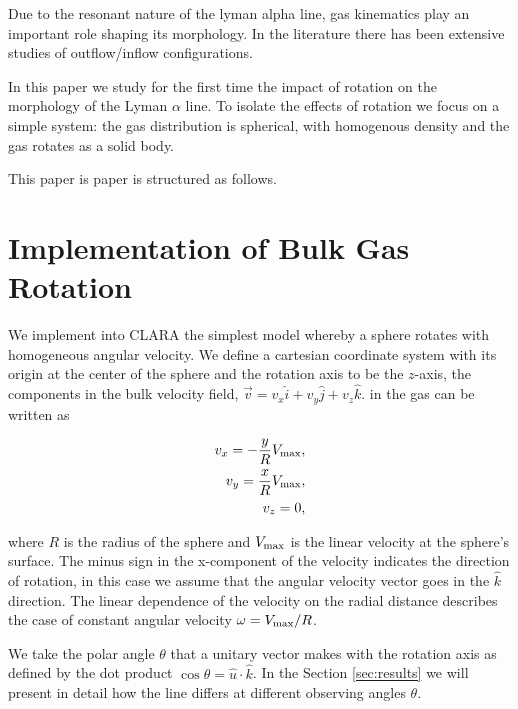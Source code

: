 \documentclass[usenatbib]{mn2e}
\begin{document}
Due to the resonant nature of the lyman alpha line, gas kinematics
play an important role shaping its morphology. In the literature there
has been extensive studies of outflow/inflow configurations. 

In this paper we study for the first time the impact of rotation on
the morphology of the Lyman $\alpha$ line. To isolate the effects of
rotation we focus on a simple system: the gas distribution is
spherical, with homogenous density and the gas rotates as a solid
body.

This paper is paper is structured as follows.



\section{Implementation of Bulk Gas Rotation}
\label{sec:implementation}

We implement into CLARA the simplest model whereby a sphere rotates
with homogeneous angular velocity. We define a cartesian coordinate
system with its origin at the center of the sphere and the rotation
axis to be the $z$-axis, the components in the bulk velocity field, $\vec{v}
= v_{x}\hat{i} + v_{y}\hat{j} + v_{z}\hat{k}$. in the gas can be written as 
 
\begin{subequations}
\begin{align}
    v_{x}=-\dfrac{y}{R}V_{\rm max}, \label{subeq1}\\
    v_{y}=\dfrac{x}{R}V_{\rm max}, \label{subeq2}\\
    v_{z}=0, \label{subeq3}
\end{align}
\end{subequations}

where $R$ is the radius of the sphere and $V_{\rm max}$ is the linear
velocity at the sphere's surface. The minus sign in the x-component of
the velocity indicates the direction of rotation, in this case we
assume that the angular velocity vector goes in the $\hat{k}$
direction.  The linear dependence of the velocity on the radial
distance describes the case of constant angular velocity
$\omega=V_{\rm max}/R$.  

We take the polar angle $\theta$ that a unitary vector makes with the
rotation axis as defined by the dot product $\cos\theta =
{\hat{u}\cdot\hat{k}}$. In the Section \ref{sec:results} we will
present in detail how the line differs at different observing angles
$\theta$. 
\end{document}
